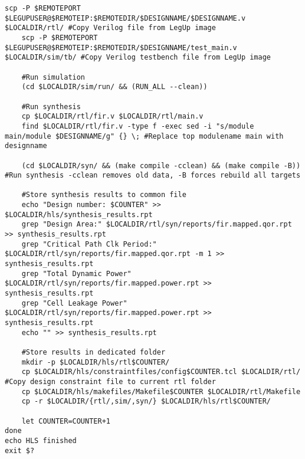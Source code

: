 \begin{lstlisting}[caption={HLS Script source code}label=lst:hlsscript]
	scp -P $REMOTEPORT $LEGUPUSER@$REMOTEIP:$REMOTEDIR/$DESIGNNAME/$DESIGNNAME.v $LOCALDIR/rtl/ #Copy Verilog file from LegUp image
	scp -P $REMOTEPORT $LEGUPUSER@$REMOTEIP:$REMOTEDIR/$DESIGNNAME/test_main.v $LOCALDIR/sim/tb/ #Copy Verilog testbench file from LegUp image
	
	#Run simulation
	(cd $LOCALDIR/sim/run/ && (RUN_ALL --clean)) 
	
	#Run synthesis
	cp $LOCALDIR/rtl/fir.v $LOCALDIR/rtl/main.v
	find $LOCALDIR/rtl/fir.v -type f -exec sed -i "s/module main/module $DESIGNNAME/g" {} \; #Replace top modulename main with designname
	
	(cd $LOCALDIR/syn/ && (make compile -cclean) && (make compile -B)) #Run synthesis -cclean removes old data, -B forces rebuild all targets
	
	#Store synthesis results to common file
	echo "Design number: $COUNTER" >> $LOCALDIR/hls/synthesis_results.rpt
	grep "Design Area:" $LOCALDIR/rtl/syn/reports/fir.mapped.qor.rpt >> synthesis_results.rpt
	grep "Critical Path Clk Period:" $LOCALDIR/rtl/syn/reports/fir.mapped.qor.rpt -m 1 >> synthesis_results.rpt
	grep "Total Dynamic Power" $LOCALDIR/rtl/syn/reports/fir.mapped.power.rpt >> synthesis_results.rpt
	grep "Cell Leakage Power" $LOCALDIR/rtl/syn/reports/fir.mapped.power.rpt >> synthesis_results.rpt
	echo "" >> synthesis_results.rpt
	
	#Store results in dedicated folder
	mkdir -p $LOCALDIR/hls/rtl$COUNTER/
	cp $LOCALDIR/hls/constraintfiles/config$COUNTER.tcl $LOCALDIR/rtl/ #Copy design constraint file to current rtl folder
	cp $LOCALDIR/hls/makefiles/Makefile$COUNTER $LOCALDIR/rtl/Makefile
	cp -r $LOCALDIR/{rtl/,sim/,syn/} $LOCALDIR/hls/rtl$COUNTER/
	
	let COUNTER=COUNTER+1 
done
echo HLS finished
exit $?
\end{lstlisting}


